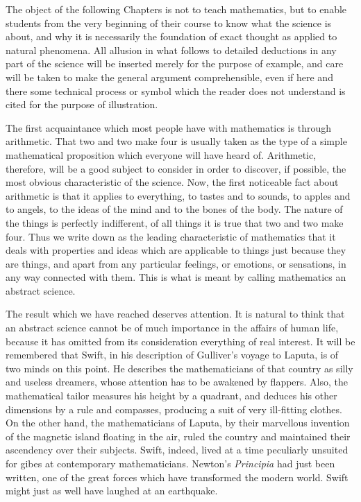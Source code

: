 \documentclass[12pt,leqno]{book}[2005/09/16]
\newcommand{\PageSep}[1]{\ignorespaces}
\newcommand{\Title}[1]{\textit{#1}}
\begin{document}
The object of the following Chapters is not
to teach mathematics, but to enable students
from the very beginning of their course to
know what the science is about, and why it is
necessarily the foundation of exact thought
as applied to natural phenomena. All allusion
in what follows to detailed deductions
in any part of the science will be inserted
\PageSep{9}
merely for the purpose of example, and care
will be taken to make the general argument
comprehensible, even if here and there some
technical process or symbol which the reader
does not understand is cited for the purpose
of illustration.

The first acquaintance which most people
%
have with mathematics is through arithmetic.
That two and two make four is usually taken
as the type of a simple mathematical proposition
which everyone will have heard of.
Arithmetic, therefore, will be a good subject
to consider in order to discover, if possible,
the most obvious characteristic of the science.
Now, the first noticeable fact about arithmetic
is that it applies to everything, to tastes and
to sounds, to apples and to angels, to the
ideas of the mind and to the bones of the
body. The nature of the things is perfectly
indifferent, of all things it is true that two
and two make four. Thus we write down as
the leading characteristic of mathematics
that it deals with properties and ideas
which are applicable to things just because
they are things, and apart from any particular
feelings, or emotions, or sensations, in any
way connected with them. This is what
is meant by calling mathematics an abstract
science.

The result which we have reached deserves
attention. It is natural to think that an
\PageSep{10}
abstract science cannot be of much importance
in the affairs of human life, because it
has omitted from its consideration everything
of real interest. It will be remembered
that Swift, in his description of Gulliver's
%
voyage to Laputa, is of two minds on this
%
point. He describes the mathematicians of
that country as silly and useless dreamers,
whose attention has to be awakened by
flappers. Also, the mathematical tailor measures
his height by a quadrant, and deduces
his other dimensions by a rule and compasses,
producing a suit of very ill-fitting clothes.
On the other hand, the mathematicians of
Laputa, by their marvellous invention of the
magnetic island floating in the air, ruled the
country and maintained their ascendency
over their subjects. Swift, indeed, lived at
a time peculiarly unsuited for gibes at contemporary
mathematicians. Newton's \Title{Principia}
%
had just been written, one of the great
forces which have transformed the modern
world. Swift might just as well have laughed
at an earthquake.
\end{document}
